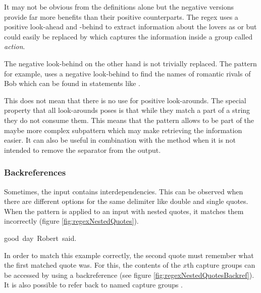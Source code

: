 It may not be obvious from the definitions alone but the negative versions provide far more benefits than their positive counterparts. The regex  uses a positive look-ahead and -behind to extract information about the lovers as  or  but could easily be replaced by  which captures the information inside a group called \emph{action}.

The negative look-behind on the other hand is not trivially replaced. The pattern  for example, uses a negative look-behind to find the names of romantic rivals of Bob which can be found in statements like .

This does not mean that there is no use for positive look-arounds. The special property that all look-arounds poses is that while they match a part of a string they do not consume them. This means that the pattern  allows  to be part of the maybe more complex subpattern  which may make retrieving the information easier. It can also be useful in combination with the  method when it is not intended to remove the separator from the output.

\subsubsection{Backreferences}

Sometimes, the input contains interdependencies. This can be observed when there are different options for the same delimiter like double and single quotes. When the pattern  is applied to an input with nested quotes, it matches them incorrectly (figure \ref{fig:regexNestedQuotes}).

\begin{listingBox}[title={Nested Quotes matched incorrectly by \pattern{("|').*?("|')}},label=fig:regexNestedQuotes,width=14cm,center]
    good~day~Robert~said.
\end{listingBox}


In order to match this example correctly, the second quote must remember what the first matched quote was. For this, the contents of the $x$th capture groups can be accessed by using a backreference  (see figure \ref{fig:regexNestedQuotesBackref}). It is also possible to refer back to named capture groups .

